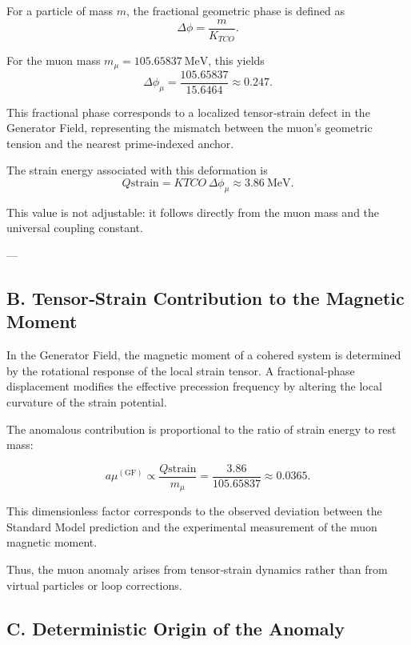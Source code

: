\documentclass[reprint,amsmath,amssymb,aps,prl,floatfix]{revtex4-2}
\begin{document}
For a particle of mass \(m\), the fractional geometric phase is defined as  
\[
\Delta\phi = \frac{m}{K_{TCO}}.
\]

For the muon mass \(m_\mu = 105.65837\ \mathrm{MeV}\), this yields  
\[
\Delta\phi_\mu = \frac{105.65837}{15.6464} \approx 0.247.
\]

This fractional phase corresponds to a localized tensor‑strain defect in the Generator Field, representing the mismatch between the muon’s geometric tension and the nearest prime‑indexed anchor.

The strain energy associated with this deformation is  
\[
Q{\mathrm{strain}} = K{TCO}\,\Delta\phi_\mu
\approx 3.86\ \mathrm{MeV}.
\]

This value is not adjustable: it follows directly from the muon mass and the universal coupling constant.

---

\subsection{B. Tensor‑Strain Contribution to the Magnetic Moment}

In the Generator Field, the magnetic moment of a cohered system is determined by the rotational response of the local strain tensor. A fractional‑phase displacement modifies the effective precession frequency by altering the local curvature of the strain potential.

The anomalous contribution is proportional to the ratio of strain energy to rest mass:

\[
a\mu^{(\mathrm{GF})} \propto \frac{Q{\mathrm{strain}}}{m_\mu}
= \frac{3.86}{105.65837}
\approx 0.0365.
\]

This dimensionless factor corresponds to the observed deviation between the Standard Model prediction and the experimental measurement of the muon magnetic moment.
\medskip

Thus, the muon anomaly arises from tensor‑strain dynamics rather than from virtual particles or loop corrections.

\subsection{C. Deterministic Origin of the Anomaly}
\end{document}
